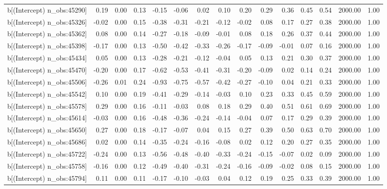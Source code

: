 \begin{table}[ht]
\begin{tabular}{rrrrrrrrrrrrrrr}
  b[(Intercept) n\_obs:45290] & 0.19 & 0.00 & 0.13 & -0.15 & -0.06 & 0.02 & 0.10 & 0.20 & 0.29 & 0.36 & 0.45 & 0.54 & 2000.00 & 1.00 \\ 
  b[(Intercept) n\_obs:45326] & -0.02 & 0.00 & 0.15 & -0.38 & -0.31 & -0.21 & -0.12 & -0.02 & 0.08 & 0.17 & 0.27 & 0.38 & 2000.00 & 1.00 \\ 
  b[(Intercept) n\_obs:45362] & 0.08 & 0.00 & 0.14 & -0.27 & -0.18 & -0.09 & -0.01 & 0.08 & 0.18 & 0.26 & 0.37 & 0.44 & 2000.00 & 1.00 \\ 
  b[(Intercept) n\_obs:45398] & -0.17 & 0.00 & 0.13 & -0.50 & -0.42 & -0.33 & -0.26 & -0.17 & -0.09 & -0.01 & 0.07 & 0.16 & 2000.00 & 1.00 \\ 
  b[(Intercept) n\_obs:45434] & 0.05 & 0.00 & 0.13 & -0.28 & -0.21 & -0.12 & -0.04 & 0.05 & 0.13 & 0.21 & 0.30 & 0.37 & 2000.00 & 1.00 \\ 
  b[(Intercept) n\_obs:45470] & -0.20 & 0.00 & 0.17 & -0.62 & -0.53 & -0.41 & -0.31 & -0.20 & -0.09 & 0.02 & 0.14 & 0.24 & 2000.00 & 1.00 \\ 
  b[(Intercept) n\_obs:45506] & -0.26 & 0.01 & 0.24 & -0.93 & -0.75 & -0.57 & -0.42 & -0.27 & -0.10 & 0.04 & 0.21 & 0.33 & 2000.00 & 1.00 \\ 
  b[(Intercept) n\_obs:45542] & 0.10 & 0.00 & 0.19 & -0.41 & -0.29 & -0.14 & -0.03 & 0.10 & 0.23 & 0.33 & 0.45 & 0.59 & 2000.00 & 1.00 \\ 
  b[(Intercept) n\_obs:45578] & 0.29 & 0.00 & 0.16 & -0.11 & -0.03 & 0.08 & 0.18 & 0.29 & 0.40 & 0.51 & 0.61 & 0.69 & 2000.00 & 1.00 \\ 
  b[(Intercept) n\_obs:45614] & -0.03 & 0.00 & 0.16 & -0.48 & -0.36 & -0.24 & -0.14 & -0.04 & 0.07 & 0.17 & 0.29 & 0.39 & 2000.00 & 1.00 \\ 
  b[(Intercept) n\_obs:45650] & 0.27 & 0.00 & 0.18 & -0.17 & -0.07 & 0.04 & 0.15 & 0.27 & 0.39 & 0.50 & 0.63 & 0.70 & 2000.00 & 1.00 \\ 
  b[(Intercept) n\_obs:45686] & 0.02 & 0.00 & 0.14 & -0.35 & -0.24 & -0.16 & -0.08 & 0.02 & 0.12 & 0.20 & 0.27 & 0.35 & 2000.00 & 1.00 \\ 
  b[(Intercept) n\_obs:45722] & -0.24 & 0.00 & 0.13 & -0.56 & -0.48 & -0.40 & -0.33 & -0.24 & -0.15 & -0.07 & 0.02 & 0.09 & 2000.00 & 1.00 \\ 
  b[(Intercept) n\_obs:45758] & -0.16 & 0.00 & 0.12 & -0.49 & -0.40 & -0.31 & -0.24 & -0.16 & -0.09 & -0.02 & 0.08 & 0.15 & 2000.00 & 1.00 \\ 
  b[(Intercept) n\_obs:45794] & 0.11 & 0.00 & 0.11 & -0.17 & -0.10 & -0.03 & 0.04 & 0.12 & 0.19 & 0.25 & 0.33 & 0.39 & 2000.00 & 1.00 \\ 

\end{tabular}
\end{table}
